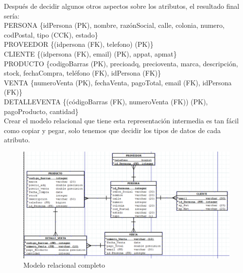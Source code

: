 \documentclass{article}
\begin{document}
Después de decidir algunos otros aspectos sobre los atributos, el resultado final sería: \\

PERSONA \{id\textunderscore Persona (PK), nombre, razón\textunderscore Social, calle, colonia, numero, cod\textunderscore Postal, tipo (CCK), estado\}\\ 

PROVEEDOR \{(id\textunderscore persona (FK), telefono) (PK)\} \\

CLIENTE \{(id\textunderscore persona (FK), email) (PK), ap\textunderscore pat, ap\textunderscore mat\} \\

PRODUCTO \{codigo\textunderscore Barras (PK), precio\textunderscore adq, precio\textunderscore venta, marca, descripción, stock, fecha\textunderscore Compra, teléfono (FK), id\textunderscore Persona (FK)\} \\

VENTA \{numero\textunderscore Venta (PK), fecha\textunderscore Venta, pago\textunderscore Total, email (FK), id\textunderscore Persona (FK)\} \\

DETALLE\textunderscore VENTA \{(código\textunderscore Barras (FK), numero\textunderscore Venta (FK)) (PK), pago\textunderscore Producto, cantidad\}\\

Crear el modelo relacional que tiene esta representación intermedia es tan fácil como copiar y pegar, solo tenemos que decidir los tipos de datos de cada atributo. \\

\begin{figure}[h]
\caption {Modelo relacional completo}
\centering
\includegraphics[width=\textwidth]{fig2}
\end{figure}
\end{document}
